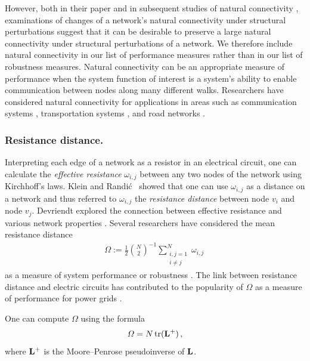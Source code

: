 \documentclass{comnet-mod}
\begin{document}
However, both in their paper \cite{Wu2010} and in subsequent studies of natural connectivity \cite{Shang2011, Zhang2013b, Chan2014}, examinations of changes of a network's natural connectivity under structural perturbations suggest that it can be desirable to preserve a large natural connectivity under structural perturbations of a network. We therefore include natural connectivity in our list of performance measures rather than in our list of robustness measures. 
Natural connectivity can be an appropriate measure of performance when the system function of interest is a system's ability to enable communication between nodes along many different walks. Researchers have considered natural connectivity for applications in areas such as communication systems \cite{Wu2010a, Gao2017}, transportation systems \cite{Xu2019}, and road networks \cite{Deng2019}.


\subsubsection{Resistance distance.}

Interpreting each edge of a network as a resistor in an electrical circuit, one can calculate the \textit{effective resistance}
$\omega_{i,j}$ between any two nodes of the network using Kirchhoff's laws. Klein and Randi{\'c}~\cite{Klein1993} showed that one can use $\omega_{i,j}$ as a distance on a network and thus referred to $\omega_{i,j}$ the \textit{resistance distance} between node $v_i$ and node $v_j$. Devriendt explored the connection between effective resistance and various network properties \cite{Devriendt2022}. Several researchers have considered the mean resistance distance 
\begin{align}
	\Omega:=\frac{1}{2}\binom{N}{2}^{-1}\sum_{\substack{i,j=1\\i\neq j}}^N\omega_{i,j}\,\nonumber
\end{align}
as a measure of system performance or robustness \cite{Ellens2011, Wang2014b, Tizghadam2015, Grunberg2016, Mackin2017, Coletta2019}. 
The link between resistance distance and electric circuits has contributed to the popularity of $\Omega$ as a measure of performance for power grids \cite{Grunberg2016, Mackin2017, Coletta2019}.

One can compute $\Omega$ using the formula~\cite{Mackin2017}
\begin{align}
	\Omega = N\,\textrm{tr}({\bf L}^+)\,,\nonumber
\end{align}
where ${\bf L}^+$ is the Moore--Penrose pseudoinverse \cite{Penrose1955} of ${\bf L}$. 
\end{document}
